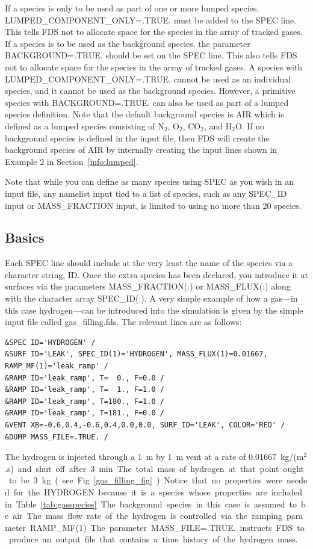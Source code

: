 \documentclass[11pt]{book}
\begin{document}
If a species is only to be used as part of one or more lumped species, {\ct LUMPED\_COMPONENT\_ONLY=.TRUE.} must be added to the {\ct SPEC} line.  This tells FDS not to allocate space for the species in the array of tracked gases. If a species is to be used as the background species, the parameter {\ct BACKGROUND=.TRUE.} should be set on the {\ct SPEC} line. This also tells FDS not to allocate space for the species in the array of tracked gases. A species with {\ct LUMPED\_COMPONENT\_ONLY=.TRUE.} cannot be used as an individual species, and it cannot be used as the background species.  However, a primitive species with {\ct BACKGROUND=.TRUE.} can also be used as part of a lumped species definition.  Note that the default background species is {\ct AIR} which is defined as a lumped species consisting of N$_2$, O$_2$, CO$_2$, and H$_2$O.  If no background species is defined in the input file, then FDS will create the background species of {\ct AIR} by internally creating the input lines shown in Example 2 in Section~\ref{info:lumped}.

Note that while you can define as many species using {\ct SPEC} as you wish in an input file, any namelist input tied to a list of species, such as any {\ct SPEC\_ID} input or {\ct MASS\_FRACTION} input, is limited to using no more than 20 species.

\subsection{Basics}
\label{info:SPEC_Basics}
\label{gas_filling}

Each {\ct SPEC} line should include at the very least the name of the species via a character string, {\ct ID}. Once the extra species has been declared, you introduce it at surfaces via the parameters {\ct MASS\_FRACTION(:)} or {\ct MASS\_FLUX(:)} along with the character array {\ct SPEC\_ID(:)}. A very simple example of how a gas---in this case hydrogen---can be introduced into the simulation is given by the simple input file called {\ct gas\_filling.fds}. The relevant lines are as follows:
\begin{lstlisting}
&SPEC ID='HYDROGEN' /
&SURF ID='LEAK', SPEC_ID(1)='HYDROGEN', MASS_FLUX(1)=0.01667, RAMP_MF(1)='leak_ramp' /
&RAMP ID='leak_ramp', T=  0., F=0.0 /
&RAMP ID='leak_ramp', T=  1., F=1.0 /
&RAMP ID='leak_ramp', T=180., F=1.0 /
&RAMP ID='leak_ramp', T=181., F=0.0 /
&VENT XB=-0.6,0.4,-0.6,0.4,0.0,0.0, SURF_ID='LEAK', COLOR='RED' /
&DUMP MASS_FILE=.TRUE. /
\end{lstlisting}
The hydrogen is injected through a 1~m by 1~m vent at a rate of 0.01667~\si{kg/(m$^2$.s)} and shut off after 3~min. The total mass of hydrogen at that point ought to be 3~kg (see Fig.~\ref{gas_filling_fig}). Notice that no properties were needed for the {\ct HYDROGEN} because it is a species whose properties are included in Table~\ref{tab:gasspecies}. The background species in this case is assumed to be air. The mass flow rate of the hydrogen is controlled via the ramping parameter {\ct RAMP\_MF(1)}. The parameter {\ct MASS\_FILE=.TRUE.} instructs FDS to produce an output file that contains a time history of the hydrogen mass.
\end{document}
